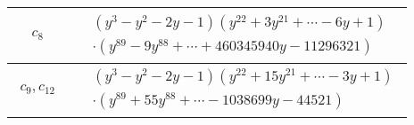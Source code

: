 \documentclass[1p]{elsarticle_modified}
\theoremstyle{definition}
\begin{document}
\begin{tabular}{m{50pt}|m{274pt}}
\hline $$\begin{aligned}c_{8}\end{aligned}$$&$\begin{aligned}
&(y^3- y^2-2 y-1)(y^{22}+3 y^{21}+\cdots-6 y+1)\\
&\cdot(y^{89}-9 y^{88}+\cdots+460345940 y-11296321)
\end{aligned}$\\
\hline $$\begin{aligned}c_{9},c_{12}\end{aligned}$$&$\begin{aligned}
&(y^3- y^2-2 y-1)(y^{22}+15 y^{21}+\cdots-3 y+1)\\
&\cdot(y^{89}+55 y^{88}+\cdots-1038699 y-44521)
\end{aligned}$\\
\hline
\end{tabular}
\vskip 2pc
\end{document}
